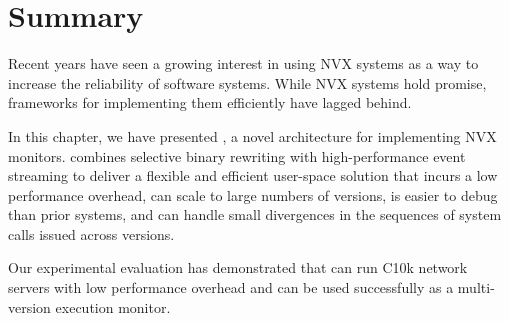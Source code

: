 \section{Summary}
\label{efficient-execution:summary}

Recent years have seen a growing interest in using NVX systems as a way to
increase the reliability of software systems. While NVX systems
hold promise, frameworks for implementing them efficiently have lagged behind.

In this chapter, we have presented \varan, a novel architecture for
implementing NVX monitors. \varan combines selective binary rewriting with
high-performance event streaming to deliver a flexible and efficient user-space
solution that incurs a low performance overhead, can scale to large numbers of
versions, is easier to debug than prior systems, and can handle small
divergences in the sequences of system calls issued across versions.

Our experimental evaluation has demonstrated that \varan can run C10k network
servers with low performance overhead and can be used successfully as a
multi-version execution monitor.
